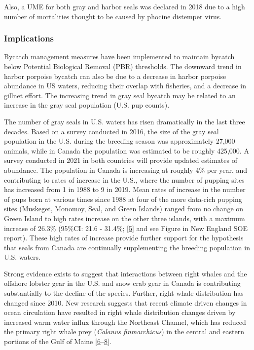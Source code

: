 \documentclass[
  10pt,
]{article}
\begin{document}
Also, a UME for both gray and harbor seals was declared in 2018 due to a
high number of mortalities thought to be caused by phocine distemper
virus.

\hypertarget{implications-5}{%
\subsubsection{Implications}\label{implications-5}}

Bycatch management measures have been implemented to maintain bycatch
below Potential Biological Removal (PBR) thresholds. The downward trend
in harbor porpoise bycatch can also be due to a decrease in harbor
porpoise abundance in US waters, reducing their overlap with fisheries,
and a decrease in gillnet effort. The increasing trend in gray seal
bycatch may be related to an increase in the gray seal population (U.S.
pup counts).

The number of gray seals in U.S. waters has risen dramatically in the
last three decades. Based on a survey conducted in 2016, the size of the
gray seal population in the U.S. during the breeding season was
approximately 27,000 animals, while in Canada the population was
estimated to be roughly 425,000. A survey conducted in 2021 in both
countries will provide updated estimates of abundance. The population in
Canada is increasing at roughly 4\% per year, and contributing to rates
of increase in the U.S., where the number of pupping sites has increased
from 1 in 1988 to 9 in 2019. Mean rates of increase in the number of
pups born at various times since 1988 at four of the more data-rich
pupping sites (Muskeget, Monomoy, Seal, and Green Islands) ranged from
no change on Green Island to high rates increase on the other three
islands, with a maximum increase of 26.3\% (95\%CI: 21.6 - 31.4\%;
{[}\protect\hyperlink{ref-wood_rates_2020}{5}{]} and see Figure in New
England SOE report). These high rates of increase provide further
support for the hypothesis that seals from Canada are continually
supplementing the breeding population in U.S. waters.

Strong evidence exists to suggest that interactions between right whales
and the offshore lobster gear in the U.S. and snow crab gear in Canada
is contributing substantially to the decline of the species. Further,
right whale distribution has changed since 2010. New research suggests
that recent climate driven changes in ocean circulation have resulted in
right whale distribution changes driven by increased warm water influx
through the Northeast Channel, which has reduced the primary right whale
prey (\emph{Calanus finmarchicus}) in the central and eastern portions
of the Gulf of Maine
{[}\protect\hyperlink{ref-hayes_north_2018}{6}--\protect\hyperlink{ref-sorochan_north_2019}{8}{]}.
\end{document}
